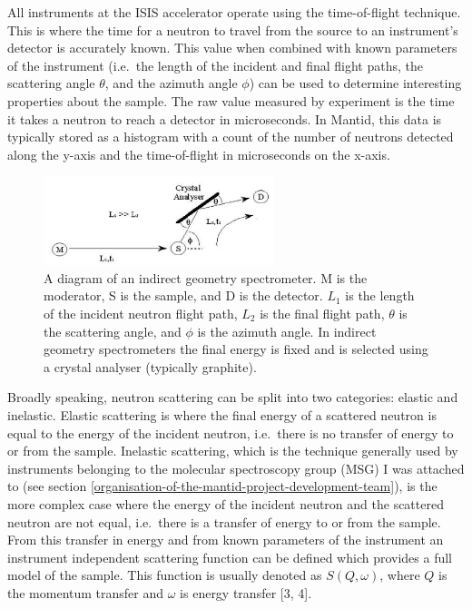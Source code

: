 \documentclass[paper=a4, fontsize=11pt]{scrartcl}	%
\numberwithin{equation}{section}															%
\numberwithin{figure}{section}																%
\numberwithin{table}{section}
\begin{document}
All instruments at the ISIS accelerator operate using the time-of-flight
technique. This is where the time for a neutron to travel from the
source to an instrument's detector is accurately known. This value when
combined with known parameters of the instrument (i.e.~the length of the
incident and final flight paths, the scattering angle $\theta$, and the
azimuth angle $\phi$) can be used to determine interesting properties
about the sample. The raw value measured by experiment is the time it
takes a neutron to reach a detector in microseconds. In Mantid, this
data is typically stored as a histogram with a count of the number of
neutrons detected along the y-axis and the time-of-flight in
microseconds on the x-axis.

\begin{figure}[H]
\centering
\includegraphics[width=0.6\textwidth]{img/instrument-diagram.png}
\caption{A diagram of an indirect geometry spectrometer. M is the moderator, S is the sample, and D is the detector. $L_1$ is the length of the incident neutron flight path, $L_2$ is the final flight path, $\theta$ is the scattering angle, and $\phi$ is the azimuth angle. In indirect geometry spectrometers the final energy is fixed and is selected using a crystal analyser (typically graphite).}
\label{fig:instrument-diagram}
\end{figure}

Broadly speaking, neutron scattering can be split into two categories:
elastic and inelastic. Elastic scattering is where the final energy of a
scattered neutron is equal to the energy of the incident neutron,
i.e.~there is no transfer of energy to or from the sample. Inelastic
scattering, which is the technique generally used by instruments
belonging to the molecular spectroscopy group (MSG) I was attached to (see section \ref{organisation-of-the-mantid-project-development-team}),
is the more complex case where the energy of the incident neutron and
the scattered neutron are not equal, i.e.~there is a transfer of energy
to or from the sample. From this transfer in energy and from known
parameters of the instrument an instrument independent scattering
function can be defined which provides a full model of the sample. This
function is usually denoted as $S(Q,\omega)$, where $Q$ is the momentum
transfer and $\omega$ is energy transfer {[}3, 4{]}.
\end{document}
